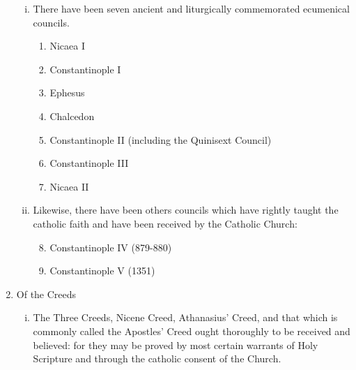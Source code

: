 \begin{enumerate}
\begin{enumerate}[i.]
		\item There have been seven ancient and liturgically commemorated ecumenical councils.
		\begin{enumerate}[1.]
			\item Nicaea I
			\item Constantinople I
			\item Ephesus
			\item Chalcedon
			\item Constantinople II (including the Quinisext Council)
			\item Constantinople III
			\item Nicaea II
		\end{enumerate}
		\item Likewise, there have been others councils which have rightly taught the catholic faith and have been received by the Catholic Church:
		\begin{enumerate}[1.]
		\setcounter{enumiii}{7}
			\item Constantinople IV (879-880)
			\item Constantinople V (1351)
		\end{enumerate}
		\end{enumerate}
	\item Of the Creeds
	\begin{enumerate}[i.]
		\item The Three Creeds, Nicene Creed, Athanasius' Creed, and that which is commonly called the Apostles' Creed ought thoroughly to be received and believed: for they may be proved by most certain warrants of Holy Scripture and through the catholic consent of the Church.
	\end{enumerate}
	\end{enumerate}
